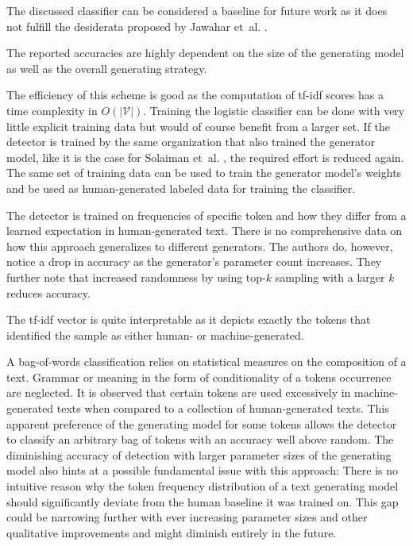     \begin{analysis}
        The discussed classifier can be considered a baseline for future work as it does not fulfill the desiderata proposed by Jawahar et~al. \cite{jawahar2020automatic}.

        The reported accuracies are highly dependent on the size of the generating model as well as the overall generating strategy.

        The efficiency of this scheme is good as the computation of tf-idf scores has a time complexity in $O(|\mathcal{V}|)$.
        Training the logistic classifier can be done with very little explicit training data but would of course benefit from a larger set.
        If the detector is trained by the same organization that also trained the generator model, like it is the case for Solaiman et~al. \cite{solaiman2019release}, the required effort is reduced again.
        The same set of training data can be used to train the generator model's weights and be used as human-generated labeled data for training the classifier.

        The detector is trained on frequencies of specific token and how they differ from a learned expectation in human-generated text.
        There is no comprehensive data on how this approach generalizes to different generators.
        The authors do, however, notice a drop in accuracy as the generator's parameter count increases.
        They further note that increased randomness by using top-$k$ sampling with a larger $k$ reduces accuracy.

        The tf-idf vector is quite interpretable as it depicts exactly the tokens that identified the sample as either human- or machine-generated. 
    \end{analysis}

    \begin{remark}
        A bag-of-words classification relies on statistical measures on the composition of a text.
        Grammar or meaning in the form of conditionality of a tokens occurrence are neglected.
        It is observed that certain tokens are used excessively in machine-generated texts when compared to a collection of human-generated texts.
        This apparent preference of the generating model for some tokens allows the detector to classify an arbitrary bag of tokens with an accuracy well above random.
        The diminishing accuracy of detection with larger parameter sizes of the generating model also hints at a possible fundamental issue with this approach:
        There is no intuitive reason why the token frequency distribution of a text generating model should significantly deviate from the human baseline it was trained on.
        This gap could be narrowing further with ever increasing parameter sizes and other qualitative improvements and might diminish entirely in the future.         
    \end{remark}

